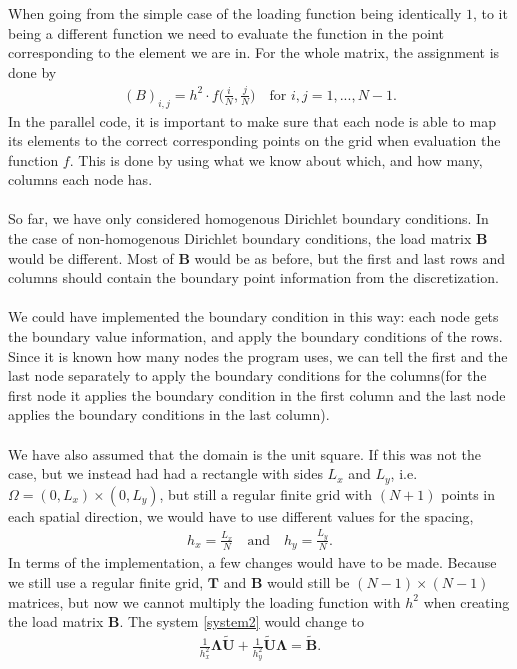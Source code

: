 When going from the simple case of the loading function being identically $1$, to it being a different function we need to evaluate the function in the point corresponding to the element we are in. For the whole matrix, the assignment is done by
\begin{align*}
	(B)_{i,j} = h^2\cdot f\Big(\frac{i}{N},\frac{j}{N}\Big) \quad \text{for } i,j = 1,...,N-1.
\end{align*}
In the parallel code, it is important to make sure that each node is able to map its elements to the correct corresponding points on the grid when evaluation the function $f$. This is done by using what we know about which, and how many, columns each node has.
\\
\\
So far, we have only considered homogenous Dirichlet boundary conditions. In the case of non-homogenous Dirichlet boundary conditions, the load matrix $\mathbf{B}$ would be different. Most of $\mathbf{B}$ would be as before, but the first and last rows and columns should contain the boundary point information from the discretization. \\
\\
We could have implemented the boundary condition in this way: each node gets the boundary value information, and apply the boundary conditions of the rows. Since it is known how many nodes the program uses, we can tell the first and the last node separately to apply the boundary conditions for the columns(for the first node it applies the boundary condition in the first column and the last node applies the boundary conditions in the last column).
\\
\\
We have also assumed that the domain is the unit square. If this was not the case, but we instead had had a rectangle with sides $L_x$ and $L_y$, i.e. $ \Omega = (0,L_x)\times (0,L_y)$, but still a regular finite grid with $(N+1)$ points in each spatial direction, we would have to use different values for the spacing, 
\begin{align*}
	h_x = \frac{L_x}{N} \quad \text{and} \quad h_y = \frac{L_y}{N}.
\end{align*}
In terms of the implementation, a few changes would have to be made. Because we still use a regular finite grid, $\mathbf{T}$ and $\mathbf{B}$ would still be $(N-1)\times (N-1)$ matrices, but now we cannot multiply the loading function with $h^2$ when creating the load matrix $\mathbf{B}$. The system \eqref{system2} would change to 
\begin{align*}
	\frac{1}{h_x^2}\mathbf{\Lambda\widetilde{U}} + \frac{1}{h_y^2}\mathbf{\widetilde{U}\Lambda} = \mathbf{\widetilde{B}}.
\end{align*}
